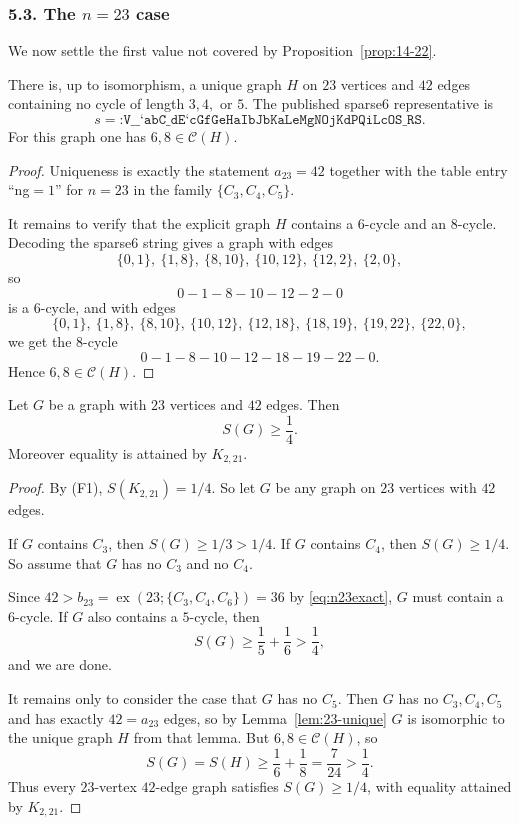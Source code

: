 \subsubsection*{5.3. The $n=23$ case}

We now settle the first value not covered by Proposition~\ref{prop:14-22}.

\begin{lemma}\label{lem:23-unique}
There is, up to isomorphism, a unique graph $H$ on $23$ vertices and $42$ edges containing no cycle of length $3,4,$ or $5$.
The published sparse6 representative is
\[
s=\texttt{:V\_\_`abC\_dE`cGfGeHaIbJbKaLeMgNOjKdPQiLcOS\_RS}.
\]
For this graph one has $6,8\in\mathcal C(H)$.
\end{lemma}

\begin{proof}
Uniqueness is exactly the statement $a_{23}=42$ together with the table entry ``ng$=1$'' for $n=23$ in the family $\{C_3,C_4,C_5\}$.

It remains to verify that the explicit graph $H$ contains a $6$-cycle and an $8$-cycle.
Decoding the sparse6 string gives a graph with edges
\[
\{0,1\},\ \{1,8\},\ \{8,10\},\ \{10,12\},\ \{12,2\},\ \{2,0\},
\]
so
\[
0-1-8-10-12-2-0
\]
is a $6$-cycle, and with edges
\[
\{0,1\},\ \{1,8\},\ \{8,10\},\ \{10,12\},\ \{12,18\},\ \{18,19\},\ \{19,22\},\ \{22,0\},
\]
we get the $8$-cycle
\[
0-1-8-10-12-18-19-22-0.
\]
Hence $6,8\in\mathcal C(H)$.
\end{proof}

\begin{proposition}[The case $(n,m)=(23,42)$]\label{prop:23-42}
Let $G$ be a graph with $23$ vertices and $42$ edges. Then
\[
S(G)\ge \frac14.
\]
Moreover equality is attained by $K_{2,21}$.
\end{proposition}

\begin{proof}
By (F1), $S(K_{2,21})=1/4$.
So let $G$ be any graph on $23$ vertices with $42$ edges.

If $G$ contains $C_3$, then $S(G)\ge 1/3>1/4$.
If $G$ contains $C_4$, then $S(G)\ge 1/4$.
So assume that $G$ has no $C_3$ and no $C_4$.

Since $42>b_{23}=\operatorname{ex}(23;\{C_3,C_4,C_6\})=36$ by \eqref{eq:n23exact},
$G$ must contain a $6$-cycle.
If $G$ also contains a $5$-cycle, then
\[
S(G)\ge \frac15+\frac16>\frac14,
\]
and we are done.

It remains only to consider the case that $G$ has no $C_5$.
Then $G$ has no $C_3,C_4,C_5$ and has exactly $42=a_{23}$ edges, so by Lemma~\ref{lem:23-unique}
$G$ is isomorphic to the unique graph $H$ from that lemma.
But $6,8\in\mathcal C(H)$, so
\[
S(G)=S(H)\ge \frac16+\frac18=\frac{7}{24}>\frac14.
\]
Thus every $23$-vertex $42$-edge graph satisfies $S(G)\ge 1/4$, with equality attained by $K_{2,21}$.
\end{proof}

